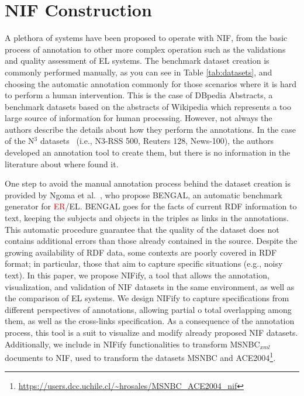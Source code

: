 \documentclass{llncs}
\begin{document}
\section{NIF Construction}
A plethora of systems have been proposed to operate with NIF, from the basic process of annotation to other more complex operation such as the validations and quality assessment of EL systems. The benchmark dataset creation is commonly performed manually, as you can see in Table \ref{tab:datasets}, and choosing the automatic annotation commonly for those scenarios where it is hard to perform a human intervention. This is the case of DBpedia Abstracts, a benchmark datasets based on the abstracts of Wikipedia which represents a too large source of information for human processing. However, not always the authors describe the details about how they perform the annotations. In the case of the N$^3$ datasets~\cite{N3} (i.e., N3-RSS 500, Reuters 128, News-100), the authors developed an annotation tool to create them, but there is no information in the literature about where found it. 

One step to avoid the manual annotation process behind the dataset creation is provided by Ngoma et al.~\cite{Bengal2018}, who propose BENGAL, an automatic benchmark generator for \textcolor{red}{ER}/EL. BENGAL goes for the facts of current RDF information to text, keeping the subjects and objects in the triples as links in the annotations. This automatic procedure guarantee that the quality of the dataset does not contains additional errors than those already contained in the source. Despite the growing availability of RDF data, some contexts are poorly covered in RDF format; in particular, those that aim to capture specific situations (e.g., noisy text). %
In this paper, we propose NIFify, a tool that allows the annotation, visualization, and validation of NIF datasets in the same environment, as well as the comparison of EL systems. We design NIFify to capture specifications from different perspectives of annotations, allowing partial o total overlapping among them, as well as the cross-links specification. As a consequence of the annotation process, this tool is a suit to visualize and modify already proposed NIF datasets. Additionally, we include in NIFify functionalities to transform MSNBC$_{xml}$ documents to NIF, used to transform the datasets MSNBC and ACE2004\footnote{\url{https://users.dcc.uchile.cl/~hrosales/MSNBC_ACE2004_nif}}. 
\end{document}
